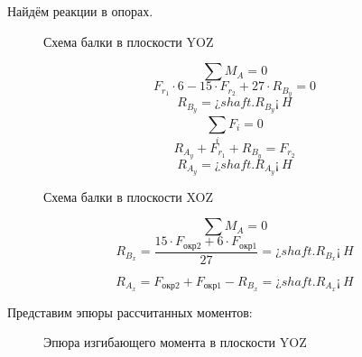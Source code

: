 \documentclass[14pt,a4paper,russian]{scrartcl}
\begin{document}
        Найдём реакции в опорах.\par
        \begin{figure}[h]
            \caption{Схема балки в плоскости YOZ}
        \end{figure}
        \[ \sum M_A = 0 \]
        \[ F_{r_1}\cdot 6 - 15\cdot F_{r_2} + 27\cdot R_{B_y} = 0\]
        \[ R_{B_y} = ¿shaft.R_B_y¡\ H\]
        \[ \sum_{i}^{}F_i = 0 \]
        \[ R_{A_y} + F_{r_1} + R_{B_y} = F_{r_2} \]
        \[ R_{A_y} = ¿shaft.R_A_y¡\ H\]        
        
        \begin{figure}[h]
            \caption{Схема балки в плоскости XOZ}
        \end{figure}
        \[ \sum M_A = 0 \]
        \[ R_{B_x} = \frac{15\cdot F_{\text{окр2}} + 6\cdot F_{\text{окр1}}}{27} = ¿shaft.R_B_x¡\ H\]
        
        \[ R_{A_x} = F_{\text{окр2}} + F_{\text{окр1}} - R_{B_x} = ¿shaft.R_A_x¡\ H\]

        Представим эпюры рассчитанных моментов:
 
        \begin{figure}[!h]
            \caption{Эпюра изгибающего момента в плоскости YOZ}
        \end{figure}
\end{document}
